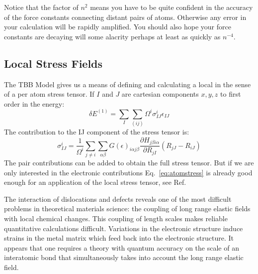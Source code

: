 Notice that the factor of $n^{2}$ means you have to be quite confident in the accuracy of
the force constants connecting distant pairs of atoms. Otherwise any error
in your calculation will be rapidly amplified. You should also hope your force
constants are decaying will some alacrity perhaps at least as quickly as $n^{-4}$.

\subsection{Local Stress Fields}
The TBB Model \cite{nielsen83, sutton88} gives us a means of defining and calculating 
a local in the sense of a per atom stress tensor. If $I$ and $J$ 
are cartesian components $x,y,z$ to first order in the energy:
%
\begin{equation}
\delta E^(1) = \sum_{I} \sum_{(ij)}\Omega^{i}\sigma^{i}_{IJ}\epsilon_{IJ}
\end{equation}
%
The contribution to the IJ component of the stress tensor is:
%
\begin{equation}
\label{eq:atomstress}
\sigma^{i}_{IJ} = \frac{1}{\Omega^{i}}\sum_{j\neq i}\sum_{\alpha\beta}G(\epsilon)_{i\alpha j\beta}\frac{\partial H_{j\beta i\alpha}}{\partial R_{jI}}(R_{jJ}-R_{iJ})
\end{equation}
%
The pair contributions can be added to obtain the full stress tensor. 
But if we are only interested in the electronic contributions
Eq.~\ref{eq:atomstress} is already good enough
for an application of the local stress tensor,
see Ref.~\cite{ohta90}


The interaction of dislocations and defects reveals one of the most difficult problems
in theoretical materials science: the coupling of long range elastic fields
with local chemical changes. This coupling of length scales makes
reliable quantitative calculations difficult. Variations in the electronic structure
induce strains in the metal matrix which feed back into the electronic structure. 
It appears that one requires a theory with quantum accuracy on the scale of an 
interatomic bond that simultaneously takes into account the long range elastic 
field.


